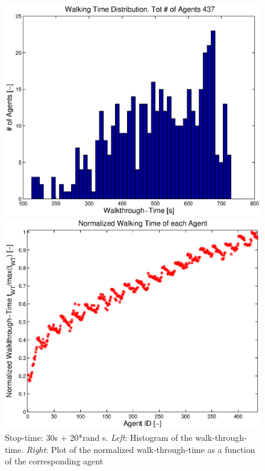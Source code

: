 \documentclass[11pt]{article}
\begin{document}
\begin{figure}[h]
 	\begin{minipage}{0.48\textwidth}
		\includegraphics[width = \textwidth]{Images/RESULTS04_RandomStop30/WalkingTimeHist.eps}
 	 \end{minipage}
  	\hfill
  	\begin{minipage}{0.48\textwidth}
   		 \includegraphics[width = \textwidth]{Images/RESULTS04_RandomStop30/NormalizedWalkingTimePlot.eps}
  	\end{minipage}
  	\caption{Stop-time: 30s + 20*rand s. \emph{Left}: Histogram of the walk-through-time. \emph{Right}: Plot of the normalized walk-through-time as a function of the corresponding agent}
  	\label{img:stopTime15WTT}
\end{figure}
\end{document}
